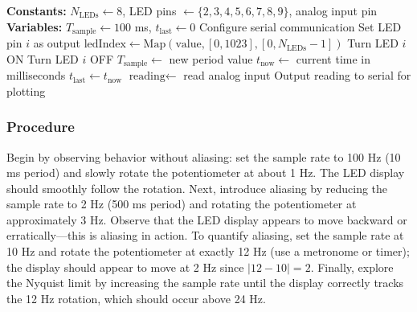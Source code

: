 \begin{algorithm}
\caption{Aliasing Demonstration with LED Array}
\label{alg:aliasing_demo}
\begin{algorithmic}[1]
\State \textbf{Constants:} $N_{\text{LEDs}} \gets 8$, LED pins $\gets \{2, 3, 4, 5, 6, 7, 8, 9\}$, analog input pin
\State \textbf{Variables:} $T_{\text{sample}} \gets 100$ ms, $t_{\text{last}} \gets 0$
\State
{}
    \State Configure serial communication
        \State Set LED pin $i$ as output
    \EndFor
\EndProcedure
\State
{}
    \State $\text{ledIndex} \gets \text{Map}(\text{value}, [0, 1023], [0, N_{\text{LEDs}} - 1])$
            \State Turn LED $i$ ON
        \Else
            \State Turn LED $i$ OFF
        \EndIf
    \EndFor
\EndProcedure
\State
{}
        \State $T_{\text{sample}} \gets$ new period value
    \EndIf
    \State $t_{\text{now}} \gets$ current time in milliseconds
        \State $t_{\text{last}} \gets t_{\text{now}}$
        \State $\text{reading} \gets$ read analog input
        \State {}
        \State Output reading to serial for plotting
    \EndIf
\EndProcedure
\end{algorithmic}
\end{algorithm}

\subsubsection{Procedure}

Begin by observing behavior without aliasing: set the sample rate to 100 Hz (10 ms period) and slowly rotate the potentiometer at about 1 Hz. The LED display should smoothly follow the rotation. Next, introduce aliasing by reducing the sample rate to 2 Hz (500 ms period) and rotating the potentiometer at approximately 3 Hz. Observe that the LED display appears to move backward or erratically---this is aliasing in action. To quantify aliasing, set the sample rate at 10 Hz and rotate the potentiometer at exactly 12 Hz (use a metronome or timer); the display should appear to move at 2 Hz since $|12 - 10| = 2$. Finally, explore the Nyquist limit by increasing the sample rate until the display correctly tracks the 12 Hz rotation, which should occur above 24 Hz.

